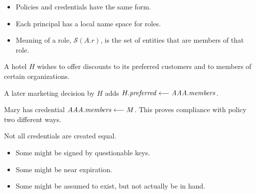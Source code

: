 \documentclass[landscape]{slides}
\begin{document}
\begin{itemize}
\item Policies and credentials have the same form.
\item Each principal has a local name space for roles.
\item Meaning of a role, $\mathcal{S}(A.r)$, is the set of entities that are members of that role.
\end{itemize}
\stopslide


A hotel $H$ wishes to offer discounts to its preferred customers and to members of certain organizations.

\begin{mathpar}


\end{mathpar}

A later marketing decision by $H$ adds $\cred{H.\mathit{preferred}}{\mathit{AAA}.\mathit{members}}{}$.

Mary has credential $\cred{\mathit{AAA}.\mathit{members}}{M}{}$. This proves compliance with policy two different ways.
\stopslide



\centerline{\box\graph}

\begin{mathpar}




\end{mathpar}
\stopslide



Not all credentials are created equal.

\begin{itemize}
\item Some might be signed by questionable keys.
\item Some might be near expiration.
\item Some might be assumed to exist, but not actually be in hand.
\end{itemize}
\end{document}
